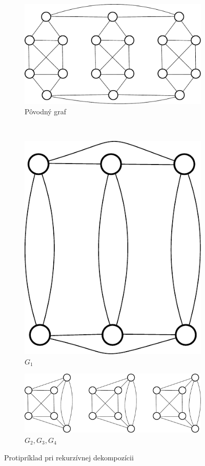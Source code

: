 \begin{figure}[h]
  \centering
  \begin{subfigure}[b]{1\textwidth}
    \centering
    \includegraphics[scale=0.5]{img/bad4.pdf}
    \caption{Pôvodný graf}
  \end{subfigure}\\
  \begin{subfigure}[b]{0.35\textwidth}
    \centering
    \includegraphics[scale=0.5]{img/bd1.pdf}
    \caption{$G_1$}
  \end{subfigure}
  \begin{subfigure}[b]{0.6\textwidth}
    \centering
    \includegraphics[scale=0.5]{img/bd2.pdf}
    \caption{$G_2, G_3, G_4$}
  \end{subfigure}
  \caption{Protipríklad pri rekurzívnej dekompozícii}
  \label{fig:bd}
\end{figure}



